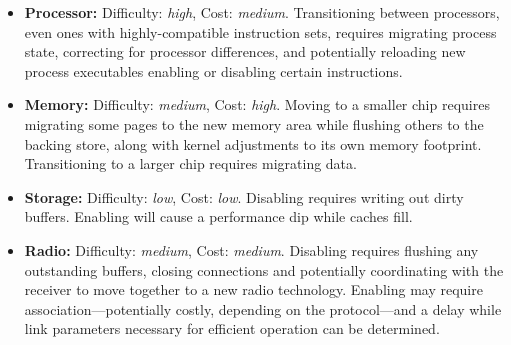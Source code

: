 \begin{itemize}

\item \textbf{Processor:} Difficulty: \textit{high}, Cost: \textit{medium}.
Transitioning between processors, even ones with highly-compatible
instruction sets, requires migrating process state, correcting for processor
differences, and potentially reloading new process executables enabling or
disabling certain instructions.

\item \textbf{Memory:} Difficulty: \textit{medium}, Cost: \textit{high}.
Moving to a smaller chip requires migrating some pages to the new memory area
while flushing others to the backing store, along with kernel adjustments to
its own memory footprint. Transitioning to a larger chip requires migrating
data.

\item \textbf{Storage:} Difficulty: \textit{low}, Cost: \textit{low}.
Disabling requires writing out dirty buffers. Enabling will cause a
performance dip while caches fill.

\item \textbf{Radio:} Difficulty: \textit{medium}, Cost: \textit{medium}.
Disabling requires flushing any outstanding buffers, closing connections and
potentially coordinating with the receiver to move together to a new radio
technology. Enabling may require association---potentially costly, depending
on the protocol---and a delay while link parameters necessary for efficient
operation can be determined.

\end{itemize}
\vfill
